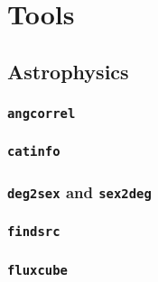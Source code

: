 \documentclass[12pt,a4paper]{report}
\begin{document}






























\chapter{Tools \label{SEC:tool}}

\section{Astrophysics \label{SEC:tool:astro}}
\subsection{\texttt{angcorrel}} 
\subsection{\texttt{catinfo}} 
\subsection{\texttt{deg2sex} and \texttt{sex2deg}}  
\subsection{\texttt{findsrc}} 
\subsection{\texttt{fluxcube}} 
\end{document}
